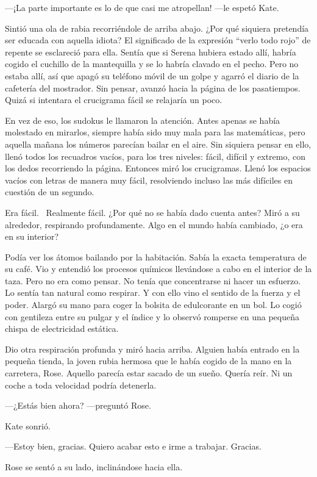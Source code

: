 ---¡La parte importante es lo de que casi me atropellan! ---le espetó
Kate.

Sintió una ola de rabia recorriéndole de arriba abajo. ¿Por qué siquiera
pretendía ser educada con aquella idiota? El significado de la
expresión ``verlo todo rojo'' de repente se esclareció para ella. Sentía
que si Serena hubiera estado allí, habría cogido el cuchillo de la
mantequilla y se lo habría clavado en el pecho. Pero no estaba allí, así
que apagó su teléfono móvil de un golpe y agarró el diario de la
cafetería del mostrador. Sin pensar, avanzó hacia la página de los
pasatiempos. Quizá si intentara el crucigrama fácil se relajaría un
poco.

En vez de eso, los sudokus le llamaron la atención. Antes apenas se
había molestado en mirarlos, siempre había sido muy mala para las
matemáticas, pero aquella mañana los números parecían bailar en el aire.
Sin siquiera pensar en ello, llenó todos los recuadros vacíos, para los
tres niveles: fácil, difícil y extremo, con los dedos recorriendo la
página. Entonces miró los crucigramas. Llenó los espacios vacíos con
letras de manera muy fácil, resolviendo incluso las más difíciles en
cuestión de un segundo.

Era fácil. ~Realmente fácil. ¿Por qué no se había dado cuenta antes?
Miró a su alrededor, respirando profundamente. Algo en el mundo había
cambiado, ¿o era en su interior?

Podía ver los átomos bailando por la habitación. Sabía la exacta
temperatura de su café. Vio y entendió los procesos químicos llevándose
a cabo en el interior de la taza. Pero no era como pensar. No tenía que
concentrarse ni hacer un esfuerzo. Lo sentía tan natural como respirar.
Y con ello vino el sentido de la fuerza y el poder. Alargó su mano para
coger la bolsita de edulcorante en un bol. Lo cogió con gentileza entre
su pulgar y el índice y lo observó romperse en una pequeña chispa de
electricidad estática.

Dio otra respiración profunda y miró hacia arriba. Alguien había entrado
en la pequeña tienda, la joven rubia hermosa que le había cogido de la
mano en la carretera, Rose. Aquello parecía estar sacado de un sueño.
Quería reír. Ni un coche a toda velocidad podría detenerla.

---¿Estás bien ahora? ---preguntó Rose.

Kate sonrió.

---Estoy bien, gracias. Quiero acabar esto e irme a trabajar. Gracias.

Rose se sentó a su lado, inclinándose hacia ella.

